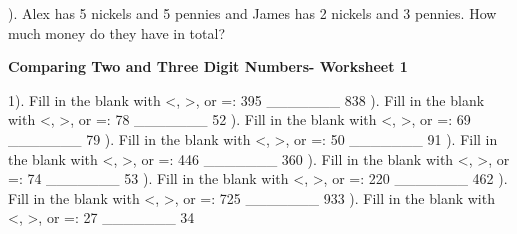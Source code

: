 \documentclass{article}%
\begin{document}
\newline%
\newline%
). Alex has 5 nickels and 5 pennies and James has 2 nickels and 3 pennies. How much money do they have in total?%
\newline%
\newline%
\newline%
\pagebreak%
\large%
\begin{center}%
\textbf{Comparing Two and Three Digit Numbers- Worksheet 1}%
\newline%
\newline%
\newline%
\end{center} \normalsize%
1). Fill in the blank with <, >, or =: 395 \_\_\_\_\_\_\_ 838%
\newline%
\newline%
). Fill in the blank with <, >, or =: 78 \_\_\_\_\_\_\_ 52%
\newline%
\newline%
). Fill in the blank with <, >, or =: 69 \_\_\_\_\_\_\_ 79%
\newline%
\newline%
). Fill in the blank with <, >, or =: 50 \_\_\_\_\_\_\_ 91%
\newline%
\newline%
). Fill in the blank with <, >, or =: 446 \_\_\_\_\_\_\_ 360%
\newline%
\newline%
). Fill in the blank with <, >, or =: 74 \_\_\_\_\_\_\_ 53%
\newline%
\newline%
). Fill in the blank with <, >, or =: 220 \_\_\_\_\_\_\_ 462%
\newline%
\newline%
). Fill in the blank with <, >, or =: 725 \_\_\_\_\_\_\_ 933%
\newline%
\newline%
). Fill in the blank with <, >, or =: 27 \_\_\_\_\_\_\_ 34%
\newline%
\newline%
\end{document}
